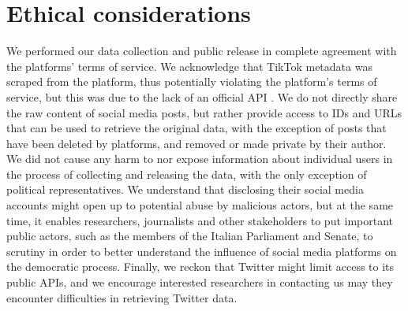 \documentclass[sigconf,screen]{acmart}
\begin{document}
\section{Ethical considerations}
We performed our data collection and public release in complete agreement with the platforms' terms of service. We acknowledge that TikTok metadata was scraped from the platform, thus potentially violating the platform's terms of service, but this was due to the lack of an official API \cite{freelon2018computational}.  We do not directly share the raw content of social media posts, but rather provide access to IDs and URLs that can be used to retrieve the original data, with the exception of posts that have been deleted by platforms, and removed or made private by their author. We did not cause any harm to nor expose information about individual users in the process of collecting and releasing the data, with the only exception of political representatives. We understand that disclosing their social media accounts might open up to potential abuse by malicious actors, but at the same time, it enables researchers, journalists and other stakeholders to put important public actors, such as the members of the Italian Parliament and Senate, to scrutiny in order to better understand the influence of social media platforms on the democratic process. Finally, we reckon that Twitter might limit access to its public APIs, and we encourage interested researchers in contacting us may they encounter difficulties in retrieving Twitter data.






\appendix
\end{document}
